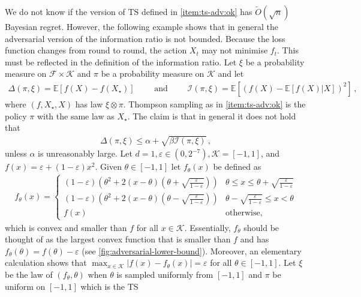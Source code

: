 \documentclass[letter, 12pt]{report}
\newcommand{\E}{\mathbb E}
\newcommand{\cK}{\mathcal K}
\newcommand{\sF}{\mathscr F}
\newcommand{\I}{\mathcal{I}}
\newcommand{\1}{\mathbf{1}}
\newcommand{\ts}{\textsc{TS}\xspace}
\renewcommand{\epsilon}{\varepsilon}
\theoremstyle{plain}
\theoremstyle{definition}
\theoremstyle{remark}
\begin{document}
We do not know if the version of \ts{} defined in \ref{item:ts-adv:ok} has $\tilde O(\sqrt{n})$ Bayesian regret.
However, the following example shows that in general the adversarial version of the information ratio is not bounded.
Because the loss function changes from round to round, the action $X_t$ may not minimise $f_t$. This must be reflected in the definition of the information
ratio. Let $\xi$ be a probability measure on $\sF \times \cK$ and $\pi$ be a probability measure on $\cK$ and let
\begin{align*}
    \Delta(\pi, \xi) = \E[f(X) - f(X_\star)]  \qquad \text{ and } \qquad
    \I(\pi, \xi) = \E[(f(X) - \E[f(X)|X])^2]\,,
\end{align*}
where $(f, X_\star, X)$ has law $\xi \otimes \pi$.
Thompson sampling as in \cref{item:ts-adv:ok} is the policy $\pi$ with the same law as $X_\star$. The claim is that in general it does not hold
that
\begin{align*}
    \Delta(\pi, \xi) \leq \alpha + \sqrt{\beta \I(\pi, \xi)}\,,
\end{align*}
unless $\alpha$ is unreasonably large.
Let $d = 1, \epsilon \in (0, 2^{-7}), \cK = [-1,1]$, and $f(x) = \epsilon + (1 - \epsilon) x^2$.
Given $\theta \in [-1,1]$ let $f_\theta(x)$ be defined as
\begin{align*}
    f_\theta(x) = \begin{cases}
                      (1-\epsilon) (\theta^2 + 2 (x - \theta)(\theta + \sqrt{\frac{\epsilon}{1-\epsilon}}))
                           & \theta \leq x \leq \theta + \sqrt{\frac{\epsilon}{1-\epsilon}} \\
                      (1-\epsilon) (\theta^2 + 2 (x - \theta)(\theta - \sqrt{\frac{\epsilon}{1-\epsilon}}))
                           & \theta - \sqrt{\frac{\epsilon}{1-\epsilon}} \leq x < \theta    \\
                      f(x) & \text{otherwise},
                  \end{cases}
\end{align*}
which is convex and smaller than $f$ for all $x \in \cK$.
Essentially, $f_\theta$ should be thought of as the largest convex function
that is smaller than $f$ and has $f_\theta(\theta) = f(\theta) - \epsilon$
(see \cref{fig:adversarial-lower-bound}).
Moreover, an elementary calculation shows that $\max_{x \in \cK} |f(x) - f_\theta(x)| = \epsilon$ for all $\theta \in [-1,1]$.
Let $\xi$ be the law of $(f_\theta, \theta)$ when $\theta$ is sampled uniformly from $[-1,1]$ and $\pi$ be uniform on $[-1,1]$ which is the \ts{}
\end{document}
